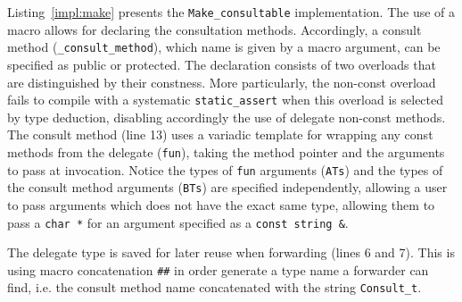 \documentclass{article}
\begin{document}
Listing~\ref{impl:make} presents the \verb+Make_consultable+ implementation. The use of a macro allows for declaring the consultation methods. Accordingly, a consult method (\verb+_consult_method+), which name is given by a macro argument, can be specified as public or protected. The declaration consists of two overloads that are distinguished by their constness. More particularly, the non-const overload fails to compile with a systematic \verb+static_assert+ when this overload is selected by type deduction, disabling accordingly the use of delegate non-const methods. The consult method (line 13) uses a variadic template for wrapping any const methods from the delegate (\verb+fun+), taking the method pointer and the arguments to pass at invocation. Notice the types of \verb+fun+ arguments (\verb+ATs+) and the types of the consult method arguments (\verb+BTs+) are specified independently, allowing a user to pass arguments which does not have the exact same type, allowing them to pass a \verb+char *+ for an argument specified as a \verb+const string &+.      
 
The delegate type is saved for later reuse when forwarding (lines 6 and 7). This is using macro concatenation \verb+##+ in order generate a type name a forwarder can find, i.e. the consult method name concatenated with the string \verb+Consult_t+. 
\end{document}
